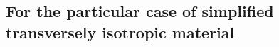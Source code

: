 \documentclass[preprint,12pt,times]{elsarticle}
\numberwithin{equation}{section}
\newcommand{\pd}[2]{\frac{\partial #1}{\partial #2}}
\renewcommand{\>}{$\Rightarrow$}
\begin{document}
%


%


\subsection{For the particular case of simplified transversely isotropic material}
\label{sec:TransverselyIsotropic}
\end{document}
